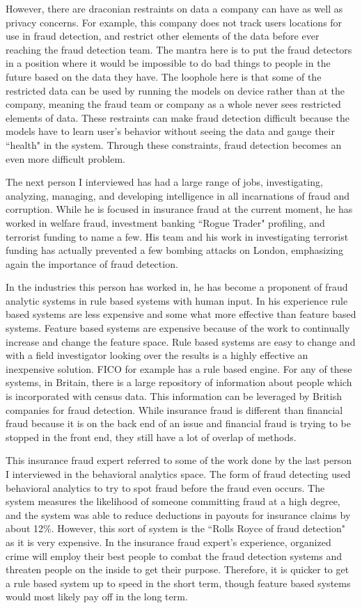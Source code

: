 \documentclass[midd]{thesis}
\begin{document}
However, there are draconian restraints on data a company can have as well as privacy concerns. For example, this company does not track users locations for use in fraud detection, and restrict other elements of the data before ever reaching the fraud detection team. The mantra here is to put the fraud detectors in a position where it would be impossible to do bad things to people in the future based on the data they have. The loophole here is that some of the restricted data can be used by running the models on device rather than at the company, meaning the fraud team or company as a whole never sees restricted elements of data. These restraints can make fraud detection difficult because the models have to learn user's behavior without seeing the data and gauge their ``health" in the system. Through these constraints, fraud detection becomes an even more difficult problem.

The next person I interviewed has had a large range of jobs, investigating, analyzing, managing, and developing intelligence in all incarnations of fraud and corruption. While he is focused in insurance fraud at the current moment, he has worked in welfare fraud, investment banking ``Rogue Trader" profiling, and terrorist funding to name a few. His team and his work in investigating terrorist funding has actually prevented a few bombing attacks on London, emphasizing again the importance of fraud detection. 

In the industries this person has worked in, he has become a proponent of fraud analytic systems in rule based systems with human input. In his experience rule based systems are less expensive and some what more effective than feature based systems. Feature based systems are expensive because of the work to continually increase and change the feature space. Rule based systems are easy to change and with a field investigator looking over the results is a highly effective an inexpensive solution. FICO for example has a rule based engine. For any of these systems, in Britain, there is a large repository of information about people which is incorporated with census data. This information can be leveraged by British companies for fraud detection. While insurance fraud is different than financial fraud because it is on the back end of an issue and financial fraud is trying to be stopped in the front end, they still have a lot of overlap of methods.

This insurance fraud expert referred to some of the work done by the last person I interviewed in the behavioral analytics space. The form of fraud detecting used behavioral analytics to try to spot fraud before the fraud even occurs. The system measures the likelihood of someone committing fraud at a high degree, and the system was able to reduce deductions in payouts for insurance claims by about 12\%. However, this sort of system is the ``Rolls Royce of fraud detection" as it is very expensive. In the insurance fraud expert's experience, organized crime will employ their best people to combat the fraud detection systems and threaten people on the inside to get their purpose. Therefore, it is quicker to get a rule based system up to speed in the short term, though feature based systems would most likely pay off in the long term.
\end{document}
